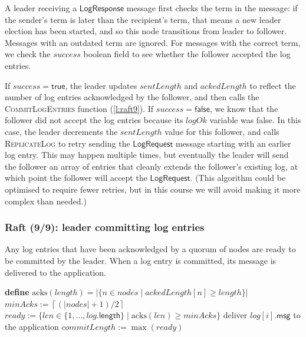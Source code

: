 A leader receiving a $\mathsf{LogResponse}$ message first checks the term in the message: if the sender's term is later than the recipient's term, that means a new leader election has been started, and so this node transitions from leader to follower.
Messages with an outdated term are ignored.
For messages with the correct term, we check the $\mathit{success}$ boolean field to see whether the follower accepted the log entries.

If $\mathit{success} = \mathsf{true}$, the leader updates $\mathit{sentLength}$ and $\mathit{ackedLength}$ to reflect the number of log entries acknowledged by the follower, and then calls the \textsc{CommitLogEntries} function (\autoref{l:raft9}).
If $\mathit{success} = \mathsf{false}$, we know that the follower did not accept the log entries because its $\mathit{logOk}$ variable was false.
In this case, the leader decrements the $\mathit{sentLength}$ value for this follower, and calls \textsc{ReplicateLog} to retry sending the $\mathsf{LogRequest}$ message starting with an earlier log entry.
This may happen multiple times, but eventually the leader will send the follower an array of entries that cleanly extends the follower's existing log, at which point the follower will accept the $\mathsf{LogRequest}$.
(This algorithm could be optimised to require fewer retries, but in this course we will avoid making it more complex than needed.)

\begin{frame}
    \label{s:raft9}
    \frametitle{Raft (9/9): leader committing log entries}
    \footnotesize
    Any log entries that have been acknowledged by a quorum of nodes are ready to be committed by the leader.
    When a log entry is committed, its message is delivered to the application.\\[1em]
    \begin{algorithmic}
        \State \textbf{define} $\mathrm{acks}(\mathit{length}) = |\{n \in \mathit{nodes} \mid \mathit{ackedLength}[n] \ge \mathit{length}\}|$
        \State
            \State $\mathit{minAcks} := \left\lceil (|\mathit{nodes}| + 1)/2 \right\rceil$
            \State $\mathit{ready} := \{\mathit{len} \in \{1,\dots,\mathit{log}.\mathsf{length}\} \mid \mathrm{acks}(\mathit{len}) \ge \mathit{minAcks}\}$
                    \State deliver $\mathit{log}[i].\mathsf{msg}$ to the application
                \EndFor
                \State $\mathit{commitLength} := \max(\mathit{ready})$
            \EndIf
        \EndFunction
        \State
    \end{algorithmic}
\end{frame}
\label{l:raft9}

